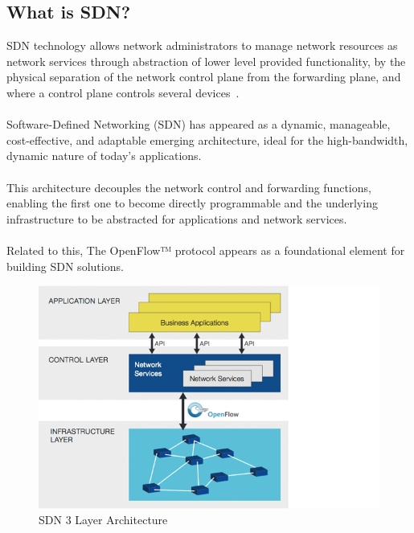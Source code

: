 \documentclass[a4paper, 12pt]{book}
\begin{document}
\subsection{What is SDN?}
SDN technology  allows network administrators to manage network resources as network services through abstraction of lower level provided functionality, by the physical separation of the network control plane from the forwarding plane, and where a control plane controls several devices~\cite{OpenNetworkingSDNDefinition}.\\
\\
Software-Defined Networking (SDN) has appeared as a dynamic, manageable, cost-effective, and adaptable emerging architecture, ideal for the high-bandwidth, dynamic nature of today's applications.\\
\\
This architecture decouples the network control and forwarding functions, enabling the first one to become directly programmable and the underlying infrastructure to be abstracted for applications and network services.\\
\\
Related to this, The OpenFlow™ protocol appears as a foundational element for building SDN solutions.

\begin{center}
 \begin{figure}
 \begin{center}
   \includegraphics[width=20cm]{img/sdn-3layers.png}
   \caption{SDN 3 Layer Architecture}
   \label{fig:sdn3layer}
 \end{center}
 \end{figure}
\end{center}
\end{document}
